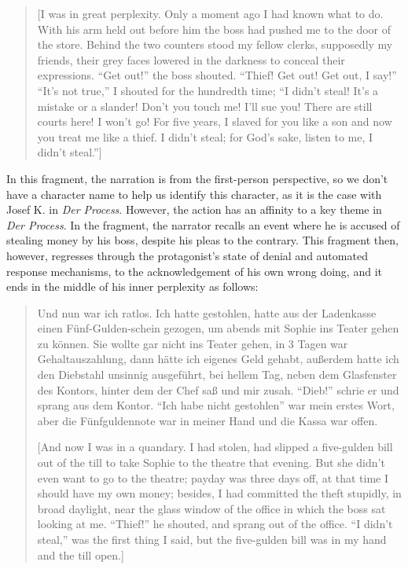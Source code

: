 \begin{paper}
\begin{quote}
{[}I was in great perplexity. Only a moment ago I had known what to do.
With his arm held out before him the boss had pushed me to the door of
the store. Behind the two counters stood my fellow clerks, supposedly my
friends, their grey faces lowered in the darkness to conceal their
expressions. ``Get out!'' the boss shouted. ``Thief! Get out! Get out, I
say!'' ``It's not true,'' I shouted for the hundredth time; ``I didn't
steal! It's a mistake or a slander! Don't you touch me! I'll sue you!
There are still courts here! I won't go! For five years, I slaved for
you like a son and now you treat me like a thief. I didn't steal; for
God's sake, listen to me, I didn't steal.''{]} 

\begin{flushright}
    \parencite[298]{kafka_diaries_1975}
\end{flushright}

\end{quote}

In this fragment, the narration is from the first-person perspective, so
we don't have a character name to help us identify this character, as it
is the case with Josef K. in \emph{Der Process}. However, the action has
an affinity to a key theme in \emph{Der Process}. In the fragment, the
narrator recalls an event where he is accused of stealing money by his
boss, despite his pleas to the contrary. This fragment then, however,
regresses through the protagonist's state of denial and automated
response mechanisms, to the acknowledgement of his own wrong doing, and
it ends in the middle of his inner perplexity as follows:

\begin{quote}
Und nun war ich ratlos. Ich hatte gestohlen, hatte aus der Ladenkasse
einen Fünf-Gulden-schein gezogen, um abends mit Sophie ins Teater gehen
zu können. Sie wollte gar nicht ins Teater gehen, in 3 Tagen war
Gehaltauszahlung, dann hätte ich eigenes Geld gehabt, außerdem hatte ich
den Diebstahl unsinnig ausgeführt, bei hellem Tag, neben dem Glasfenster
des Kontors, hinter dem der Chef saß und mir zusah. ``Dieb!{}'' schrie er
und sprang aus dem Kontor. ``Ich habe nicht gestohlen'' war mein erstes
Wort, aber die Fünfguldennote war in meiner Hand und die Kassa war
offen. 

\begin{flushright}
    \parencite[668]{kafka_tagebucher_1990}
\end{flushright}

{[}And now I was in a quandary. I had stolen, had slipped a five-gulden
bill out of the till to take Sophie to the theatre that evening. But she
didn't even want to go to the theatre; payday was three days off, at
that time I should have my own money; besides, I had committed the theft
stupidly, in broad daylight, near the glass window of the office in
which the boss sat looking at me. ``Thief!'' he shouted, and sprang out of
the office. ``I didn't steal,'' was the first thing I said, but the
five-gulden bill was in my hand and the till open.{]} 


\end{quote}
\end{paper}
